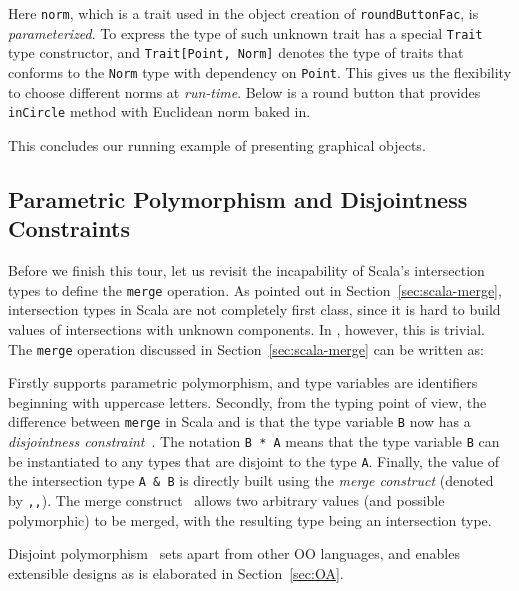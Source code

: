 \noindent Here \lstinline{norm}, which is a trait used in the object creation of
\lstinline{roundButtonFac}, is \emph{parameterized}. To express the
type of such unknown trait \name has a special 
\lstinline{Trait} type constructor, and \lstinline$Trait[Point, Norm]$
denotes the type of traits that conforms to the \lstinline$Norm$ type with dependency
on \lstinline{Point}. This gives us the
flexibility to choose different norms at \emph{run-time}. Below is a
round button that provides \lstinline{inCircle} method with Euclidean norm baked
in.

This concludes our running example of presenting graphical objects.

\subsection{Parametric Polymorphism and Disjointness Constraints}
\label{sec:merge-construct}

Before we finish this tour, let us revisit the incapability of Scala's
intersection types to define the \lstinline{merge} operation. As pointed out in
Section~\ref{sec:scala-merge}, intersection types in Scala are not completely
first class, since it is hard to build values of intersections with unknown
components. In \name, however, this is trivial. The \lstinline{merge} operation
discussed in Section~\ref{sec:scala-merge} can be written as:

\noindent Firstly \name supports parametric polymorphism, and type variables are
identifiers beginning with uppercase letters. Secondly, from the typing point of
view, the difference between \lstinline{merge} in Scala and \name is that the
type variable \lstinline{B} now has a \emph{disjointness
  constraint}~\cite{alpuimdisjoint}. The notation \lstinline{B * A} means that
the type variable \lstinline{B} can be instantiated to any types that are
disjoint to the type \lstinline{A}. Finally, the value of the intersection type
\lstinline{A & B} is directly built using the \textit{merge construct} (denoted
by \lstinline{,,}). The merge construct~\cite{dunfield2014elaborating} allows
two arbitrary values (and possible polymorphic) to be merged, with the resulting type
being an intersection type.

Disjoint polymorphism~\cite{alpuimdisjoint} sets apart \name
from other OO languages, and enables extensible designs as is elaborated in
Section~\ref{sec:OA}.
